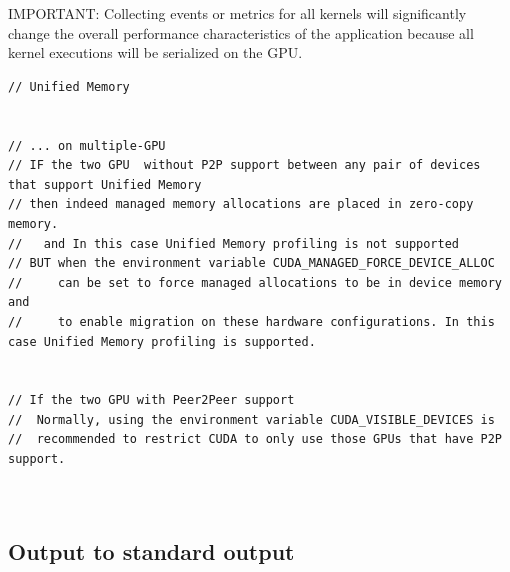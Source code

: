 IMPORTANT: Collecting events or metrics for all kernels will significantly
change the overall performance characteristics of the application because all
kernel executions will be serialized on the GPU.

\begin{verbatim}
// Unified Memory


// ... on multiple-GPU
// IF the two GPU  without P2P support between any pair of devices that support Unified Memory
// then indeed managed memory allocations are placed in zero-copy memory. 
//   and In this case Unified Memory profiling is not supported
// BUT when the environment variable CUDA_MANAGED_FORCE_DEVICE_ALLOC 
//     can be set to force managed allocations to be in device memory and 
//     to enable migration on these hardware configurations. In this case Unified Memory profiling is supported.


// If the two GPU with Peer2Peer support
//  Normally, using the environment variable CUDA_VISIBLE_DEVICES is 
//  recommended to restrict CUDA to only use those GPUs that have P2P support.



\end{verbatim}

\subsection{Output to standard output}


